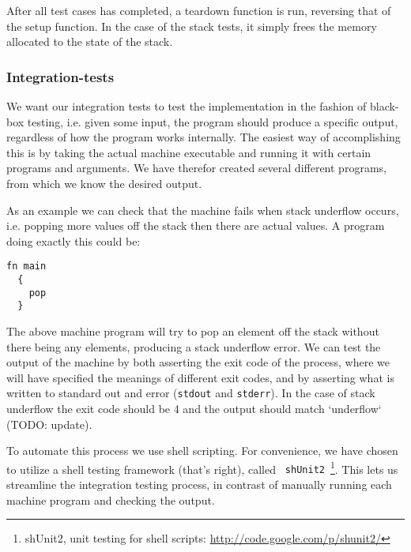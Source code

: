 After all test cases has completed, a teardown function is run, reversing that
of the setup function. In the case of the stack tests, it simply frees the
memory allocated to the state of the stack.
%


\subsubsection{Integration-tests}
We want our integration tests to test the implementation in the fashion of
black-box testing, i.e. given some input, the program should produce a specific
output, regardless of how the program works internally. The easiest way of
accomplishing this is by taking the actual machine executable and running it
with certain programs and arguments. We have therefor created several different
programs, from which we know the desired output.

As an example we can check that the machine fails when stack underflow occurs,
i.e. popping more values off the stack then there are actual values. A program
doing exactly this could be:
\begin{lstlisting}[language={bytecode},caption={Machine program producing
    stack underflow}]
  fn main
  {
    pop
  }
\end{lstlisting}

The above machine program will try to pop an element off the stack without there
being any elements, producing a stack underflow error. We can test the output of
the machine by both asserting the exit code of the process, where we will have
specified the meanings of different exit codes, and by asserting what is written
to standard out and error ({\tt stdout} and {\tt stderr}). In the case of stack
underflow the exit code should be 4 and the output should match `underflow`
(TODO: update).

To automate this process we use shell scripting. For convenience, we have chosen
to utilize a shell testing framework (that's right), called {\tt
  shUnit2}~\footnote{shUnit2, unit testing for shell scripts:
  \url{http://code.google.com/p/shunit2/}}. This lets us streamline the
integration testing process, in contrast of manually running each machine
program and checking the output.

